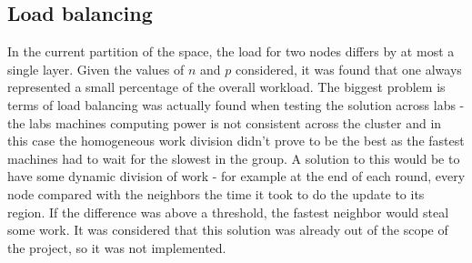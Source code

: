 \documentclass{article}
\begin{document}
%
%
%
%

\subsection{Load balancing}

In the current partition of the space, the load for two nodes differs by at most
a single layer. Given the values of $n$ and $p$ considered, it was found that
one always represented a small percentage of the overall workload. The biggest
problem is terms of load balancing was actually found when testing the solution
across labs - the labs machines computing power is not consistent across the cluster
and in this case the homogeneous work division didn't prove to be the best as
the fastest machines had to wait for the slowest in the group. A solution to
this would be to have some dynamic division of work - for example at the end
of each round, every node compared with the neighbors the time it took to do
the update to its region. If the difference was above a threshold, the fastest
neighbor would steal some work. It was considered that this solution was already
out of the scope of the project, so it was not implemented.
\end{document}
